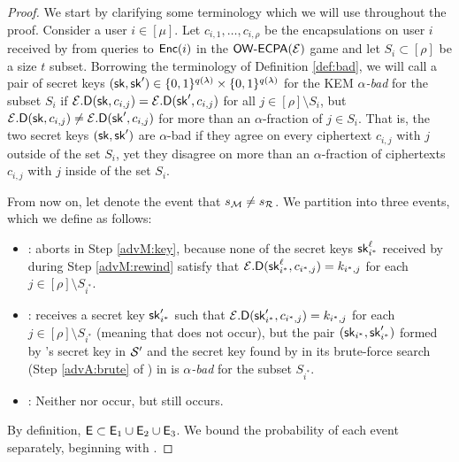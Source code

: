 \begin{proof}
  We start by clarifying some terminology which we will use throughout the proof.
  Consider a user \(i \in [\mu]\). Let \(c_{i,1}, \ldots, c_{i,\rho}\) be the encapsulations
  on user \(i\) received by \advA from queries to \(\mathsf{Enc}(i)\) in the
  \(\mathsf{OW}\text{-}\mathsf{ECPA}(\mathcal{E})\) game and let \(S_{i} \subset [\rho]\) be a size \(t\) subset.
  Borrowing the terminology of Definition \ref{def:bad},
  we will call a pair of secret keys \((\mathsf{sk}, \mathsf{sk}') \in \{0,1\}^{q(\lambda)} \times \{0,1\}^{q(\lambda)}\) for the KEM \KEM
  \emph{\(\alpha\)-bad} for the subset \(S_{i}\) if \(\mathcal{E}.\mathsf{D}(\mathsf{sk}, c_{i,j}) = \mathcal{E}.\mathsf{D}(\mathsf{sk}', c_{i,j})\)
  for all \(j \in [\rho] \setminus S_{i}\),
  but \(\mathcal{E}.\mathsf{D}(\mathsf{sk}, c_{i,j}) \ne \mathcal{E}.\mathsf{D}(\mathsf{sk}', c_{i,j})\) for more than an \(\alpha\)-fraction of \(j \in S_{i}\).
  That is, the two secret keys \((\mathsf{sk},\mathsf{sk}')\) are \(\alpha\)-bad if they agree
  on every ciphertext \(c_{i,j}\) with \(j\) outside of the set \(S_{i}\),
  yet they disagree on more than an \(\alpha\)-fraction of ciphertexts
  \(c_{i,j}\) with \(j\) inside of the set \(S_{i}\).

  From now on, let \eventE denote the event that \(s_{\redM} \ne s_{\redR}\).
  We partition \eventE into three events, which we define as follows:
  \begin{itemize}[label={\textbullet},itemsep=0.1cm]
    \item {}: \redM aborts in Step \ref{advM:key},
          because none of the secret keys \(\mathsf{sk}_{i^{*}}^{\ell}\) received by \redM during Step \ref{advM:rewind}
          satisfy that \(\mathcal{E}.\mathsf{D}(\mathsf{sk}_{i^{*}}^{\ell},c_{i^{*},j}) = k_{i^{*},j}\) for each \(j \in [\rho] \setminus S_{i^{*}}\).
    \item {}: \redM receives a secret key \(\mathsf{sk}_{i^{*}}'\) such that
          \(\mathcal{E}.\mathsf{D}(\mathsf{sk}_{i^{*}}',c_{i^{*},j}) = k_{i^{*},j}\) for each \(j \in [\rho] \setminus S_{i^{*}}\)
          (meaning that  does not occur),
          but the pair \((\mathsf{sk}_{i^{*}}, \mathsf{sk}_{i^{*}}')\) formed by \redM's secret key in \(\mathcal{S}'\)
          and the secret key found by \advA in its brute-force search (Step \ref{advA:brute} of \advA)
          in \Simple is \emph{\(\alpha\)-bad} for the subset \(S_{i^{*}}\).
    \item {}: Neither  nor  occur, but \eventE still occurs.
  \end{itemize}

  By definition, \(\mathsf{E} \subset \mathsf{E}_{1} \cup \mathsf{E}_{2} \cup \mathsf{E}_{3}\).
  We bound the probability of each event separately, beginning with .


\end{proof}
